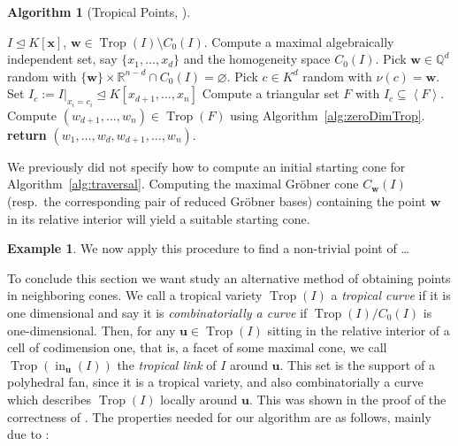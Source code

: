 \documentclass[
  paper=a4,
  titlepage,
  bibliography=totoc,
  pagesize=pdftex
]{scrartcl}
\numberwithin{figure}{section}
\numberwithin{equation}{section}
\numberwithin{table}{section}
\newcommand*\setR{\mathds{R}}
\newcommand*\setQ{\mathds{Q}}
\newcommand*\setT{\mathds{T}}
\newcommand*\ideal[1]{\left\langle #1 \right\rangle}
\let\vec\mathbf
\let\idealof\trianglelefteq
\DeclareMathOperator{\Trop}{Trop}
\DeclareMathOperator{\initial}{in}
\theoremstyle{definition}
\newtheorem{example}[definition]{Example}
\newtheorem{algo}[definition]{Algorithm}
\numberwithin{definition}{section}
\begin{document}
\begin{algo}[Tropical Points, {\cite[Algorithm~3.3]{tropPointsLinks}}]\
  \begin{algorithmic}[1]
    \Require $I \idealof K[\vec x]$,
    \Ensure $\vec w \in \Trop(I) \setminus C_0(I)$.
    \State Compute a maximal algebraically independent set, say $\{x_1, \dots, x_d\}$ and
    the homogeneity space $C_0(I)$.
    \Repeat
      \State Pick $\vec w \in \setQ^d$ random with $\{\vec w\} \times \setR^{n-d} \cap
        C_0(I) = \varnothing$.
      \State Pick $c \in K^d$ random with $\nu(c) = \vec w$.
      \State Set $I_c := I|_{x_i = c_i} \idealof K[x_{d+1}, \dots, x_n]$
    \Until{$\dim(I_c) = 0$ and $V(I_c) \subseteq \setT^{n-d}$}
    \State Compute a triangular set $F$ with $I_c \subseteq \ideal F$.
    \State Compute $(w_{d+1}, \dots, w_n) \in \Trop(F)$ using
      Algorithm~\ref{alg:zeroDimTrop}.
    \State\textbf{return} $(w_1, \dots, w_d, w_{d+1}, \dots, w_n)$.
  \end{algorithmic}
  \label{alg:tropicalPoint}
\end{algo}

We previously did not specify how to compute an initial starting cone for
Algorithm~\ref{alg:traversal}. Computing the maximal Gröbner cone $C_{\vec w}(I)$ (resp.\
the corresponding pair of reduced Gröbner bases) containing the point $\vec w$ in its
relative interior will yield a suitable starting cone.

\begin{example}
  We now apply this procedure to find a non-trivial point of \dots
\end{example}

To conclude this section we want study an alternative method of obtaining points in
neighboring cones. We call a tropical variety $\Trop(I)$ a \emph{tropical curve} if it is
one dimensional and say it is \emph{combinatorially a curve} if $\Trop(I)/C_0(I)$ is
one-dimensional. Then, for any $\vec u \in \Trop(I)$ sitting in the relative interior of a
cell of codimension one, that is, a facet of some maximal cone, we call
$\Trop(\initial_{\vec u}(I))$ the \emph{tropical link} of $I$ around $\vec u$. This set is
the support of a polyhedral fan, since it is a tropical variety, and also combinatorially
a curve which describes $\Trop(I)$ locally around $\vec u$. This was shown in the proof of
the correctness of \cite[Algorithm~4.10]{compTropVar}. The properties needed for our
algorithm are as follows, mainly due to \cite{ossTropLift}:
\end{document}
